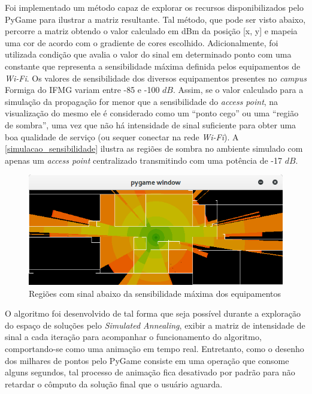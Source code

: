\documentclass[
	12pt,				%
	twoside,			%
	a4paper,			%
	english,			%
	french,				%
	spanish,			%
	brazil				%
	]{abntex2}
\begin{document}
Foi implementado um método capaz de explorar os recursos
disponibilizados pelo PyGame para ilustrar a matriz resultante. Tal
método, que pode ser visto abaixo, percorre a matriz obtendo o valor
calculado em dBm da posição {[}x, y{]} e mapeia uma cor de acordo com o
gradiente de cores escolhido. Adicionalmente, foi utilizada condição que
avalia o valor do sinal em determinado ponto com uma constante que
representa a sensibilidade máxima definida pelos equipamentos de
\emph{Wi-Fi}. Os valores de sensibilidade dos diversos equipamentos
presentes no \emph{campus} Formiga do IFMG variam entre -85 e -100
\(dB\). Assim, se o valor calculado para a simulação da propagação for
menor que a sensibilidade do \emph{access point}, na visualização do
mesmo ele é considerado como um ``ponto cego'' ou uma ``região de
sombra'', uma vez que não há intensidade de sinal suficiente para obter
uma boa qualidade de serviço (ou sequer conectar na rede \emph{Wi-Fi}).
A \autoref{simulacao_sensibilidade} ilustra as regiões de sombra no
ambiente simulado com apenas um \emph{access point} centralizado
transmitindo com uma potência de -17 \(dB\).

\begin{figure}[ht]
    \caption{\label{simulacao_sensibilidade} Regiões com sinal abaixo da sensibilidade máxima dos equipamentos}
    \begin{center}
        \includegraphics[scale=0.7]{imagens/sumulacao-sensibilidade.jpg}
    \end{center}
\end{figure}

O algoritmo foi desenvolvido de tal forma que seja possível durante a
exploração do espaço de soluções pelo \emph{Simulated Annealing}, exibir
a matriz de intensidade de sinal a cada iteração para acompanhar o
funcionamento do algoritmo, comportando-se como uma animação em tempo
real. Entretanto, como o desenho dos milhares de pontos pelo PyGame
consiste em uma operação que consome alguns segundos, tal processo de
animação fica desativado por padrão para não retardar o cômputo da
solução final que o usuário aguarda.
\end{document}
